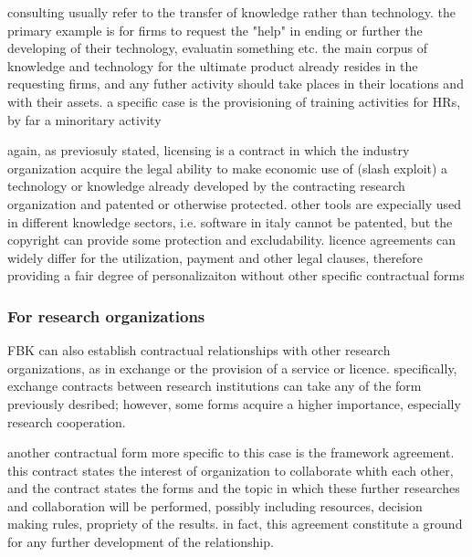 consulting usually refer to the transfer of knowledge rather than technology. the primary example is for firms to request the "help" in ending or further the developing of their technology, evaluatin something etc. the main corpus of knowledge and technology for the ultimate product already resides in the requesting firms, and any futher activity should take places in their locations and with their assets. a specific case is the provisioning of training activities for HRs, by far a minoritary activity

again, as previosuly stated, licensing is a contract in which the industry organization acquire the legal ability to make economic use of (slash exploit) a technology or knowledge already developed by the contracting research organization and patented or otherwise protected. other tools are expecially used in different knowledge sectors, i.e. software in italy cannot be patented, but the copyright can provide some protection and excludability. licence agreements can widely differ for the utilization, payment and other legal clauses, therefore providing a fair degree of personalizaiton without other specific contractual forms

\subsubsection{For research organizations}

FBK can also establish contractual relationships with other research organizations, as in exchange or the provision of a service or licence. specifically, exchange contracts between research institutions can take any of the form previously desribed; however, some forms acquire a higher importance, especially research cooperation.

another contractual form more specific to this case is the framework agreement. this contract states the interest of organization to collaborate whith each other, and the contract states the forms and the topic in which these further researches and collaboration will be performed, possibly including resources, decision making rules, propriety of the results. in fact, this agreement constitute a ground for any further development of the relationship.

